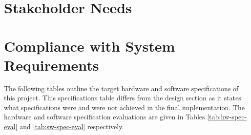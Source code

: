 \documentclass[letterpaper,11pt]{article}
\begin{document}
\section{Stakeholder Needs} %


\section{Compliance with System Requirements} %

The following tables outline the target hardware and software specifications of
this project. This specifications table differs from the design section as it
states what specifications were and were not achieved in the final
implementation. The hardware and software specification evaluations are given in
Tables \ref{tab:hw-spec-eval} and \ref{tab:sw-spec-eval} respectively.
\end{document}
